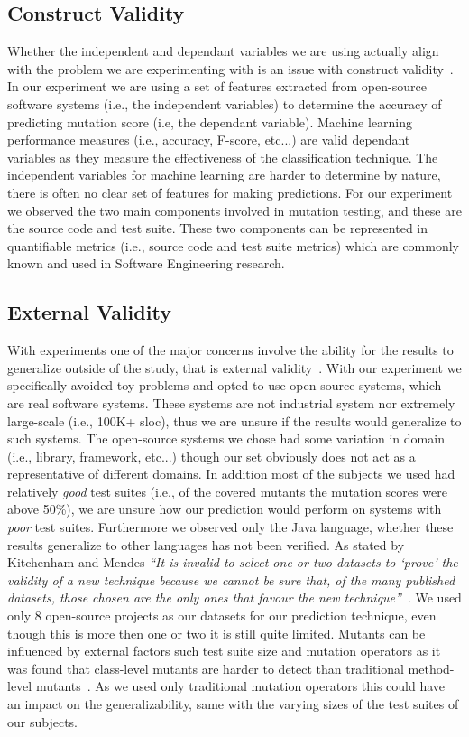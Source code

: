 \subsection{Construct Validity}
\label{subsec:experiment_construct_validity}
Whether the independent and dependant variables we are using actually align with the problem we are experimenting with is an issue with construct validity~\cite{WRH+00,WKP10}. In our experiment we are using a set of features extracted from open-source software systems (i.e., the independent variables) to determine the accuracy of predicting mutation score (i.e, the dependant variable). Machine learning performance measures (i.e., accuracy, F-score, etc...) are valid dependant variables as they measure the effectiveness of the classification technique. The independent variables for machine learning are harder to determine by nature, there is often no clear set of features for making predictions. For our experiment we observed the two main components involved in mutation testing, and these are the source code and test suite. These two components can be represented in quantifiable metrics (i.e., source code and test suite metrics) which are commonly known and used in Software Engineering research.


\subsection{External Validity}
\label{subsec:experiment_external_validity}
With experiments one of the major concerns involve the ability for the results to generalize outside of the study, that is external validity~\cite{WRH+00,WKP10}. With our experiment we specifically avoided toy-problems and opted to use open-source systems, which are real software systems. These systems are not industrial system nor extremely large-scale (i.e., 100K+ \gls{sloc}), thus we are unsure if the results would generalize to such systems. The open-source systems we chose had some variation in domain (i.e., library, framework, etc...) though our set obviously does not act as a representative of different domains. In addition most of the subjects we used had relatively \emph{good} test suites (i.e., of the covered mutants the mutation scores were above 50\%), we are unsure how our prediction would perform on systems with \emph{poor} test suites. Furthermore we observed only the Java language, whether these results generalize to other languages has not been verified. As stated by Kitchenham and Mendes \emph{``It is invalid to select one or two datasets to `prove' the validity of a new technique because we cannot be sure that, of the many published datasets, those chosen are the only ones that favour the new technique''}~\cite{KM09}. We used only 8 open-source projects as our datasets for our prediction technique, even though this is more then one or two it is still quite limited.  Mutants can be influenced by external factors such test suite size and mutation operators as it was found that class-level mutants are harder to detect than traditional method-level mutants~\cite{NK11}. As we used only traditional mutation operators this could have an impact on the generalizability, same with the varying sizes of the test suites of our subjects.

